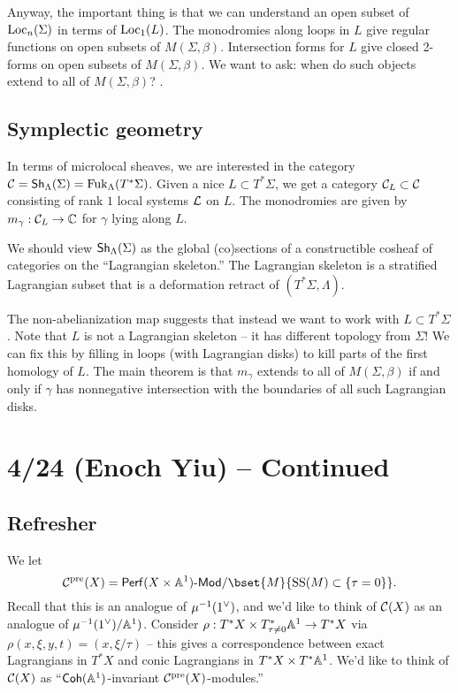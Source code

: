\documentclass{article}
\begin{document}
Anyway, the important thing is that we can understand an open subset of $\Loc_n(\Sigma)$ in terms of $\Loc_1(L)$.
The monodromies along loops in $L$ give regular functions on open subsets of $M(\Sigma, \beta)$.
Intersection forms for $L$ give closed 2-forms on open subsets of $M(\Sigma, \beta)$.
We want to ask: when do such objects extend to all of $M(\Sigma, \beta)$?
.
\subsection{Symplectic geometry}

In terms of microlocal sheaves, we are interested in the category $\Cc = \Sh_\Lambda(\Sigma) = \Fuk_\Lambda(T^* \Sigma)$.
Given a nice $L \subset T^* \Sigma$, we get a category $\Cc_L \subset \Cc$ consisting of rank $1$ local systems $\Lc$ on $L$.
The monodromies are given by $m_\gamma: \Cc_L \to \CC$ for $\gamma$ lying along $L$.

We should view $\Sh_\Lambda(\Sigma)$ as the global (co)sections of a constructible cosheaf of categories on the ``Lagrangian skeleton.''
The Lagrangian skeleton is a stratified Lagrangian subset that is a deformation retract of $(T^* \Sigma, \Lambda)$.

The non-abelianization map suggests that instead we want to work with $L \subset T^* \Sigma$.
Note that $L$ is not a Lagrangian skeleton -- it has different topology from $\Sigma$!
We can fix this by filling in loops (with Lagrangian disks) to kill parts of the first homology of $L$.
The main theorem is that $m_\gamma$ extends to all of $M(\Sigma, \beta)$ if and only if $\gamma$ has nonnegative intersection with the boundaries of all such Lagrangian disks.

\section{4/24 (Enoch Yiu) -- Continued}

\subsection{Refresher}

We let
\[
	\Cc^\pre(X) = \Perf(X \times \AA^1)\dMod / \bset{M}{\SSop(M) \subset \{ \tau = 0 \}}.
\]
Recall that this is an analogue of $\mu\inv(1^\vee)$, and we'd like to think of $\Cc(X)$ as an analogue of $\mu\inv(1^\vee) / \AA^1)$.
Consider $\rho: T^* X \times T^*_{\tau \neq 0} \AA^1 \to T^* X$ via $\rho(x, \xi, y, t) = (x, \xi / \tau)$ -- this gives a correspondence between exact Lagrangians in $T^* X$ and conic Lagrangians in $T^* X \times T^* \AA^1$.
We'd like to think of $\Cc(X)$ as ``$\Coh(\AA^1)$-invariant $\Cc^\pre(X)$-modules.''
\end{document}
